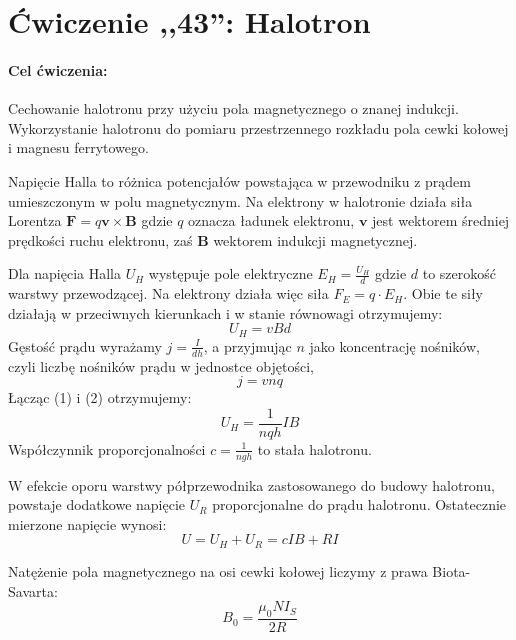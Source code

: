 \documentclass{fizykalab}
\begin{document}
\newpage

\section*{Ćwiczenie ,,43'': Halotron}
{\setlength{\parindent}{0pt}
\paragraph{Cel ćwiczenia:}
Cechowanie halotronu przy użyciu pola magnetycznego o znanej indukcji. Wykorzystanie halotronu do pomiaru przestrzennego rozkładu pola cewki kołowej i magnesu ferrytowego.
\newline

\par
Napięcie Halla to różnica potencjałów powstająca w przewodniku z prądem umieszczonym w polu magnetycznym. Na elektrony w halotronie działa siła Lorentza $\boldsymbol{F} = q\boldsymbol{v}\times\boldsymbol{B}$ gdzie $q$ oznacza ładunek elektronu, $\boldsymbol{v}$ jest wektorem średniej prędkości ruchu elektronu, zaś $\boldsymbol{B}$ wektorem indukcji magnetycznej.

Dla napięcia Halla $U_H$ występuje pole elektryczne $E_H = \frac{U_H}{d}$ gdzie $d$ to szerokość warstwy przewodzącej. Na elektrony działa więc siła $F_E = q \cdot E_H$. Obie te siły działają w przeciwnych kierunkach i w stanie równowagi otrzymujemy:
\begin{equation}
	U_H = vBd
	\tag{1}
\end{equation}
Gęstość prądu wyrażamy $j = \frac{I}{dh}$, a przyjmując $n$ jako koncentrację nośników, czyli liczbę nośników prądu w jednostce objętości,
\begin{equation}
	j=vnq
	\tag{2}
\end{equation}
Łącząc (1) i (2) otrzymujemy:
\begin{equation}
	U_H = \frac{1}{nqh}IB
	\tag{3}
\end{equation}
Współczynnik proporcjonalności $c = \frac{1}{ngh}$ to stała halotronu.

W efekcie oporu warstwy półprzewodnika zastosowanego do budowy halotronu, powstaje dodatkowe napięcie $U_R$ proporcjonalne do prądu halotronu. Ostatecznie mierzone napięcie wynosi:
\begin{equation}
	U = U_H + U_R = cIB + RI
	\tag{4}
\end{equation}

\par
Natężenie pola magnetycznego na osi cewki kołowej liczymy z prawa Biota-Savarta:
\begin{equation}
	B_0 = \frac{\mu_0 N I_S}{2R}
	\tag{5}
\end{equation}

}
\end{document}
